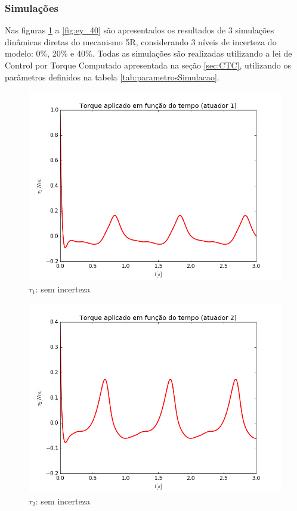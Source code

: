 \documentclass[]{politex}
\begin{document}
\subsubsection{Simulações}

Nas figuras \ref{fig:Torque1_0} a \ref{fig:ey_40} são apresentados os resultados de 3 simulações dinâmicas diretas do mecanismo 5R, considerando 3 níveis de incerteza do modelo: 0\%, 20\% e 40\%. Todas as simulações são realizadas utilizando a lei de Control por Torque Computado apresentada na seção \ref{sec:CTC}, utilizando os parâmetros definidos na tabela \ref{tab:parametrosSimulacao}.

\begin{multicols}{2}
\begin{figure}[H]
	\centering
	\includegraphics[scale=0.40]{imagens/tau1_0.png}  
	\caption{$\tau_1$: sem incerteza}
	\label{fig:Torque1_0}
\end{figure}
\begin{figure}[H]
	\centering
	\includegraphics[scale=0.40]{imagens/tau2_0.png}  
	\caption{$\tau_2$: sem incerteza}
	\label{fig:Torque2_0}
\end{figure}
\end{multicols}
\end{document}
